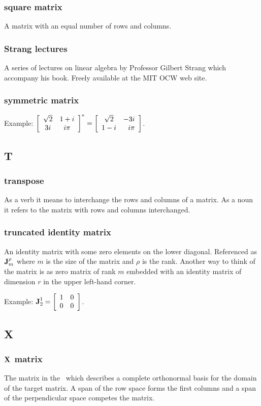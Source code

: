 \subsubsection*{square matrix}
A matrix with an equal number of rows and columns.

\subsubsection*{Strang lectures}
A series of lectures on linear algebra by Professor Gilbert Strang which accompany his book. Freely available at the MIT OCW web site.

\subsubsection*{symmetric matrix}
Example: $\mat{cc}{\sqrt{2}&1+i\\3i&i\pi}^{*}=\mat{cr}{\sqrt{2}&-3i\\1-i&i\pi}$.

\subsection*{T} 

\subsubsection*{transpose}
As a verb it means to interchange the rows and columns of a matrix. As a noun it refers to the matrix with rows and columns interchanged.

\subsubsection*{truncated identity matrix}
An identity matrix with some zero elements on the lower diagonal. Referenced as $\J{m}{\rho}$ where $m$ is the size of the matrix and $\rho$ is the rank. Another way to think of the matrix is as zero matrix of rank $m$ embedded with an identity matrix of dimension $r$ in the upper left-hand corner.

Example: $\J{2}{1} = \mat{cc}{1 & 0 \\ 0 & 0}$.

\subsection*{X} 

\subsubsection*{$\X{}$ matrix}
The matrix in the \svdl \ which describes a complete orthonormal basis for the domain of the target matrix. A span of the row space forms the first columns and a span of the perpendicular space competes the matrix.


